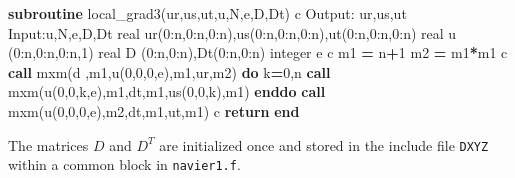 \documentclass[
]{scrartcl}
\newenvironment{Shaded}{}{}
\newcommand{\DataTypeTok}[1]{\textcolor[rgb]{0.56,0.13,0.00}{#1}}
\newcommand{\DecValTok}[1]{\textcolor[rgb]{0.25,0.63,0.44}{#1}}
\newcommand{\KeywordTok}[1]{\textcolor[rgb]{0.00,0.44,0.13}{\textbf{#1}}}
\newcommand{\NormalTok}[1]{#1}
\begin{document}
\begin{Shaded}
\begin{Highlighting}[]
       \KeywordTok{subroutine}\NormalTok{ local\_grad3(ur,us,ut,u,N,e,D,Dt)}
\NormalTok{ c     Output: ur,us,ut         Input:u,N,e,D,Dt}
       \DataTypeTok{real}\NormalTok{ ur(}\DecValTok{0}\NormalTok{:n,}\DecValTok{0}\NormalTok{:n,}\DecValTok{0}\NormalTok{:n),us(}\DecValTok{0}\NormalTok{:n,}\DecValTok{0}\NormalTok{:n,}\DecValTok{0}\NormalTok{:n),ut(}\DecValTok{0}\NormalTok{:n,}\DecValTok{0}\NormalTok{:n,}\DecValTok{0}\NormalTok{:n)}
       \DataTypeTok{real}\NormalTok{ u (}\DecValTok{0}\NormalTok{:n,}\DecValTok{0}\NormalTok{:n,}\DecValTok{0}\NormalTok{:n,}\DecValTok{1}\NormalTok{)}
       \DataTypeTok{real}\NormalTok{ D (}\DecValTok{0}\NormalTok{:n,}\DecValTok{0}\NormalTok{:n),Dt(}\DecValTok{0}\NormalTok{:n,}\DecValTok{0}\NormalTok{:n)}
       \DataTypeTok{integer}\NormalTok{ e}
\NormalTok{ c}
\NormalTok{       m1 }\KeywordTok{=}\NormalTok{ n}\KeywordTok{+}\DecValTok{1}
\NormalTok{       m2 }\KeywordTok{=}\NormalTok{ m1}\KeywordTok{*}\NormalTok{m1}
\NormalTok{ c}
       \KeywordTok{call}\NormalTok{ mxm(d ,m1,u(}\DecValTok{0}\NormalTok{,}\DecValTok{0}\NormalTok{,}\DecValTok{0}\NormalTok{,e),m1,ur,m2)}
       \KeywordTok{do}\NormalTok{ k}\KeywordTok{=}\DecValTok{0}\NormalTok{,n}
          \KeywordTok{call}\NormalTok{ mxm(u(}\DecValTok{0}\NormalTok{,}\DecValTok{0}\NormalTok{,k,e),m1,dt,m1,us(}\DecValTok{0}\NormalTok{,}\DecValTok{0}\NormalTok{,k),m1)}
       \KeywordTok{enddo}
       \KeywordTok{call}\NormalTok{ mxm(u(}\DecValTok{0}\NormalTok{,}\DecValTok{0}\NormalTok{,}\DecValTok{0}\NormalTok{,e),m2,dt,m1,ut,m1)}
\NormalTok{ c}
       \KeywordTok{return}
       \KeywordTok{end}
\end{Highlighting}
\end{Shaded}

The matrices \(D\) and \(D^T\) are initialized once and stored in the
include file \texttt{DXYZ} within a common block in \texttt{navier1.f}.
\end{document}
